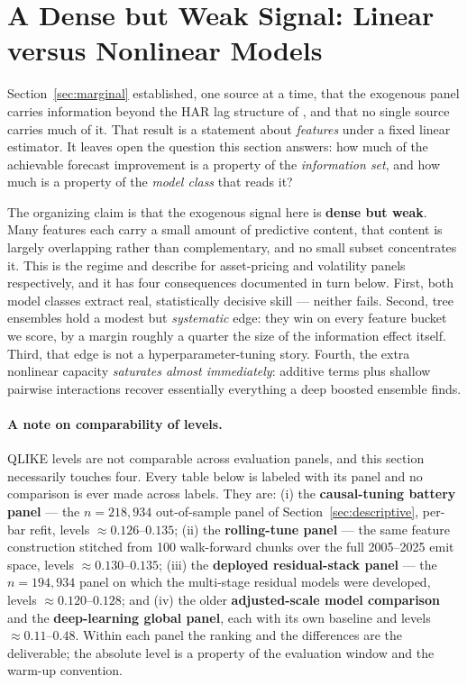 \section{A Dense but Weak Signal: Linear versus Nonlinear Models}
\label{sec:linvsnonlin}

Section~\ref{sec:marginal} established, one source at a time, that the exogenous
panel carries information beyond the HAR lag structure of \citet{Corsi2009}, and
that no single source carries much of it. That result is a statement about
\emph{features} under a fixed linear estimator. It leaves open the question this
section answers: how much of the achievable forecast improvement is a property of
the \emph{information set}, and how much is a property of the \emph{model class}
that reads it?

The organizing claim is that the exogenous signal here is \textbf{dense but
weak}. Many features each carry a small amount of predictive content, that
content is largely overlapping rather than complementary, and no small subset
concentrates it. This is the regime \citet{gu2020empirical} and
\citet{christensen2023machine} describe for asset-pricing and volatility panels
respectively, and it has four consequences documented in turn below. First, both
model classes extract real, statistically decisive skill --- neither fails.
Second, tree ensembles hold a modest but \emph{systematic} edge: they win on
every feature bucket we score, by a margin roughly a quarter the size of the
information effect itself. Third, that edge is not a hyperparameter-tuning story.
Fourth, the extra nonlinear capacity \emph{saturates almost immediately}:
additive terms plus shallow pairwise interactions recover essentially everything
a deep boosted ensemble finds.

\paragraph{A note on comparability of levels.}
QLIKE levels are not comparable across evaluation panels, and this section
necessarily touches four. Every table below is labeled with its panel and no
comparison is ever made across labels. They are: (i) the \textbf{causal-tuning
battery panel} --- the $n = 218{,}934$ out-of-sample panel of
Section~\ref{sec:descriptive}, per-bar refit, levels $\approx 0.126$--$0.135$;
(ii) the \textbf{rolling-tune panel} --- the same feature construction stitched
from 100 walk-forward chunks over the full 2005--2025 emit space, levels
$\approx 0.130$--$0.135$; (iii) the \textbf{deployed residual-stack panel} ---
the $n = 194{,}934$ panel on which the multi-stage residual models were
developed, levels $\approx 0.120$--$0.128$; and (iv) the older
\textbf{adjusted-scale model comparison} and the \textbf{deep-learning global
panel}, each with its own baseline and levels $\approx 0.11$--$0.48$. Within
each panel the ranking and the differences are the deliverable; the absolute
level is a property of the evaluation window and the warm-up convention.


